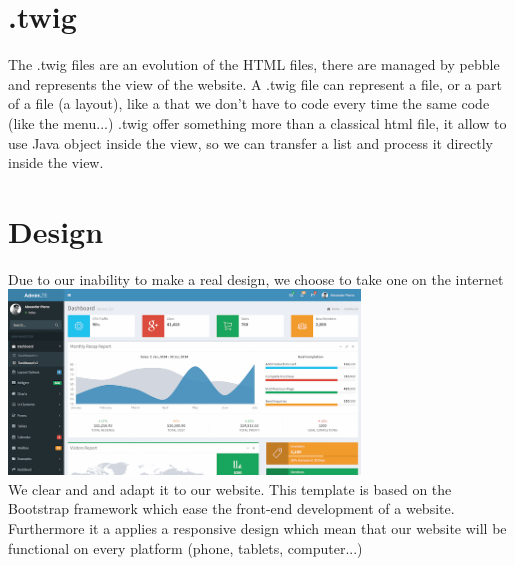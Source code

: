 \section{.twig}

The .twig files are an evolution of the HTML files, there are managed by pebble and represents the view of the website.
A .twig file can represent a file, or a part of a file (a layout), like a that we don't have to code every time the same code (like the menu...)
.twig offer something more than a classical html file, it allow to use Java object inside the view, so we can transfer a list and process it directly inside the view.


\section{Design}

Due to our inability to make a real design, we choose to take one on the internet
\\
\includegraphics[width=0.70\textwidth]{img/design.png}
\\
We clear and and adapt it to our website.
This template is based on the Bootstrap framework which ease the front-end development of a website. Furthermore it a applies a responsive design which mean that our website will be functional on every platform (phone, tablets, computer...)









